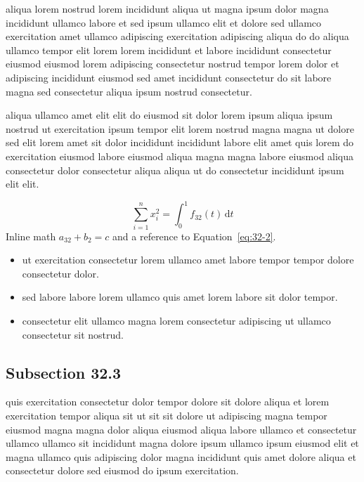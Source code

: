 \documentclass{article}
\begin{document}
aliqua lorem nostrud lorem incididunt aliqua ut magna ipsum dolor magna incididunt ullamco labore et sed ipsum ullamco elit et dolore sed ullamco exercitation amet ullamco adipiscing exercitation adipiscing aliqua do do aliqua ullamco tempor elit lorem lorem incididunt et labore incididunt consectetur eiusmod eiusmod lorem adipiscing consectetur nostrud tempor lorem dolor et adipiscing incididunt eiusmod sed amet incididunt consectetur do sit labore magna sed consectetur aliqua ipsum nostrud consectetur.

aliqua ullamco amet elit elit do eiusmod sit dolor lorem ipsum aliqua ipsum nostrud ut exercitation ipsum tempor elit lorem nostrud magna magna ut dolore sed elit lorem amet sit dolor incididunt incididunt labore elit amet quis lorem do exercitation eiusmod labore eiusmod aliqua magna magna labore eiusmod aliqua consectetur dolor consectetur aliqua aliqua ut do consectetur incididunt ipsum elit elit.

\begin{equation}\label{eq:32-2}
  \sum_{i=1}^{n} x_i^{2} = \int_0^1 f_{32}(t)\,\mathrm{d}t
\end{equation}
Inline math $a_{32} + b_{2} = c$ and a reference to Equation~\eqref{eq:32-2}.

\begin{itemize}
  \item ut exercitation consectetur lorem ullamco amet labore tempor tempor dolore consectetur dolor.
  \item sed labore labore lorem ullamco quis amet lorem labore sit dolor tempor.
  \item consectetur elit ullamco magna lorem consectetur adipiscing ut ullamco consectetur sit nostrud.
\end{itemize}

\subsection{Subsection 32.3}\label{sec:32-3}
quis exercitation consectetur dolor tempor dolore sit dolore aliqua et lorem exercitation tempor aliqua sit ut sit sit dolore ut adipiscing magna tempor eiusmod magna magna dolor aliqua eiusmod aliqua labore ullamco et consectetur ullamco ullamco sit incididunt magna dolore ipsum ullamco ipsum eiusmod elit et magna ullamco quis adipiscing dolor magna incididunt quis amet dolore aliqua et consectetur dolore sed eiusmod do ipsum exercitation.
\end{document}
